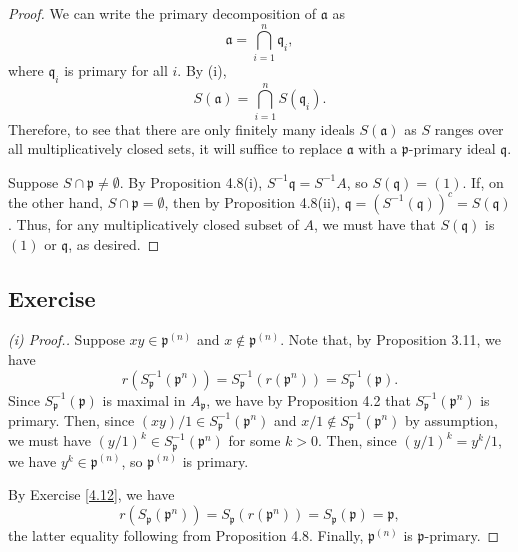 \begin{proof}
We can write the primary decomposition of $\mathfrak{a}$ as 
$$\mathfrak{a} = \bigcap_{i=1}^n \mathfrak{q}_i,$$
where $\mathfrak{q}_i$ is primary for all $i$. By (i),
$$S(\mathfrak{a}) = \bigcap_{i=1}^n S(\mathfrak{q}_i).$$
Therefore, to see that there are only finitely many ideals $S(\mathfrak{a})$ as $S$ ranges over all multiplicatively closed sets, it will suffice to replace $\mathfrak{a}$ with 
a $\mathfrak{p}$-primary ideal $\mathfrak{q}$.

Suppose $S \cap \mathfrak{p} \neq \emptyset$. By Proposition 4.8(i), $S^{-1}\mathfrak{q} = S^{-1}A$, so $S(\mathfrak{q}) = (1)$. If, on the other hand, $S \cap \mathfrak{p} = \emptyset$, then
by Proposition 4.8(ii), $\mathfrak{q} = (S^{-1}(\mathfrak{q}))^c = S(\mathfrak{q})$. Thus, for any multiplicatively closed subset of $A$, we must have that $S(\mathfrak{q})$ is $(1)$ or $\mathfrak{q}$,
as desired.
\end{proof}

\subsection{Exercise}\label{4.13}

\begin{proof}[(i) Proof.]
Suppose $xy \in \mathfrak{p}^{(n)}$ and $x \not\in \mathfrak{p}^{(n)}$. Note that, by Proposition 3.11, we have 
$$r(S_{\mathfrak{p}}^{-1}(\mathfrak{p}^n)) = S_{\mathfrak{p}}^{-1}(r(\mathfrak{p}^n)) = S_{\mathfrak{p}}^{-1}(\mathfrak{p}).$$
Since $S_{\mathfrak{p}}^{-1}(\mathfrak{p})$ is maximal in $A_{\mathfrak{p}}$, we have by Proposition 4.2 that $S_{\mathfrak{p}}^{-1}(\mathfrak{p}^n)$ is primary. Then,
since $(xy)/1 \in S_{\mathfrak{p}}^{-1}(\mathfrak{p}^n)$ and $x/1 \not\in S_{\mathfrak{p}}^{-1}(\mathfrak{p}^n)$ by assumption, we must have $(y/1)^k \in S_{\mathfrak{p}}^{-1}(\mathfrak{p}^n)$
for some $k > 0$. Then, since $(y/1)^k = y^k/1$, we have $y^k \in \mathfrak{p}^{(n)}$, so $\mathfrak{p}^{(n)}$ is primary.

By Exercise \ref{4.12}, we have
$$r(S_{\mathfrak{p}}(\mathfrak{p}^n)) = S_{\mathfrak{p}}(r(\mathfrak{p}^n)) = S_{\mathfrak{p}}(\mathfrak{p}) = \mathfrak{p},$$
the latter equality following from Proposition 4.8. Finally, $\mathfrak{p}^{(n)}$ is $\mathfrak{p}$-primary.
\end{proof}

